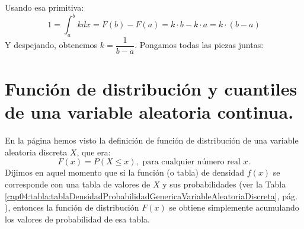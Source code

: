 Usando esa primitiva:
\[
1=\int_a^b k dx=F(b)-F(a)=k\cdot b-k\cdot a=k\cdot(b-a)
\]
Y despejando, obtenemos $k=\dfrac{1}{b-a}$. Pongamos todas las piezas juntas:
    \begin{center}
    \end{center}


\section{Función de distribución y cuantiles de una variable aleatoria continua.}
\label{cap05:sec:FuncionDistribucionVariableContinua}

En la página \pageref{cap04:ecu:FuncionDistribucionVariableDiscreta} hemos visto la definición de función de distribución de una  variable aleatoria discreta $X$, que era:
\[F(x)=P(X\leq x),\mbox{ para cualquier número real }x.\]
Dijimos en aquel momento que si la función (o tabla) de densidad $f(x)$ se corresponde con una tabla de valores de $X$ y sus probabilidades (ver la Tabla \ref{cap04:tabla:tablaDensidadProbabilidadGenericaVariableAleatoriaDiscreta}, pág.
\pageref{cap04:tabla:tablaDensidadProbabilidadGenericaVariableAleatoriaDiscreta}), entonces la función de distribución $F(x)$ se obtiene simplemente acumulando los valores de probabilidad de esa tabla.

